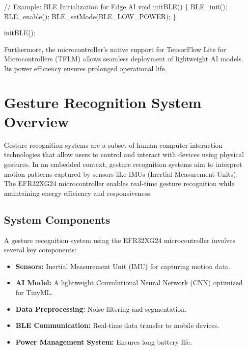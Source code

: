 \documentclass[
  9pt,
  letterpaper,
  abstract,
  titlepage]{scrbook}
\newenvironment{Shaded}{\begin{snugshade}}{\end{snugshade}}
\newcommand{\CommentTok}[1]{\textcolor[rgb]{0.37,0.37,0.37}{#1}}
\newcommand{\DataTypeTok}[1]{\textcolor[rgb]{0.68,0.00,0.00}{#1}}
\newcommand{\NormalTok}[1]{\textcolor[rgb]{0.00,0.23,0.31}{#1}}
\newcommand{\OperatorTok}[1]{\textcolor[rgb]{0.37,0.37,0.37}{#1}}
\begin{document}
\begin{Shaded}
\begin{Highlighting}[]
\CommentTok{// Example: BLE Initialization for Edge AI}
\DataTypeTok{void}\NormalTok{ initBLE}\OperatorTok{()} \OperatorTok{\{}
\NormalTok{    BLE\_init}\OperatorTok{();}
\NormalTok{    BLE\_enable}\OperatorTok{();}
\NormalTok{    BLE\_setMode}\OperatorTok{(}\NormalTok{BLE\_LOW\_POWER}\OperatorTok{);}
\OperatorTok{\}}

\NormalTok{initBLE}\OperatorTok{();}
\end{Highlighting}
\end{Shaded}

Furthermore, the microcontroller's native support for TensorFlow Lite
for Microcontrollers (TFLM) allows seamless deployment of lightweight AI
models. Its power efficiency ensures prolonged operational life.

\section{Gesture Recognition System
Overview}\label{gesture-recognition-system-overview}

Gesture recognition systems are a subset of human-computer interaction
technologies that allow users to control and interact with devices using
physical gestures. In an embedded context, gesture recognition systems
aim to interpret motion patterns captured by sensors like IMUs (Inertial
Measurement Units). The EFR32XG24 microcontroller enables real-time
gesture recognition while maintaining energy efficiency and
responsiveness.

\subsection{System Components}\label{system-components}

A gesture recognition system using the EFR32XG24 microcontroller
involves several key components:

\begin{itemize}
\item
  \textbf{Sensors:} Inertial Measurement Unit (IMU) for capturing motion
  data.
\item
  \textbf{AI Model:} A lightweight Convolutional Neural Network (CNN)
  optimized for TinyML.
\item
  \textbf{Data Preprocessing:} Noise filtering and segmentation.
\item
  \textbf{BLE Communication:} Real-time data transfer to mobile devices.
\item
  \textbf{Power Management System:} Ensures long battery life.
\end{itemize}
\end{document}

